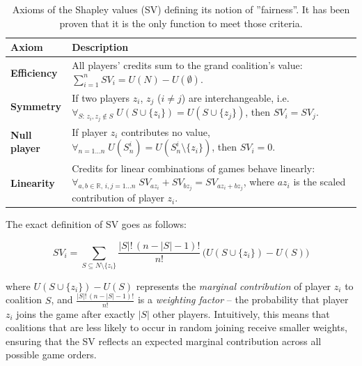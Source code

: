 \begin{table}[htbp]
\caption{Axioms of the Shapley values (SV) defining its notion of ''fairness''. It has been proven that it is the only function to meet those criteria.}
\centering
\renewcommand{\arraystretch}{1.1}
\setlength{\tabcolsep}{6pt}
\begin{tabular}{p{} p{}}

\toprule

\textbf{Axiom} & \textbf{Description} \\

\midrule

\textbf{Efficiency} &
All players’ credits sum to the grand coalition’s value:
$\sum_{i=1}^n SV_i = U(N) - U(\emptyset)$. \\[2pt]

\textbf{Symmetry} &
If two players $z_i$, $z_j$ ($i \neq j$) are interchangeable,
i.e.\ $\forall_{S:\, z_i, z_j \notin S}\; U(S \cup \{z_i\}) = U(S \cup \{z_j\})$,
then $SV_i = SV_j$. \\[2pt]

\textbf{Null player} &
If player $z_i$ contributes no value,
$\forall_{n = 1 \dots n}\; U(S_n^i) = U(S_n^i \setminus \{z_i\})$,
then $SV_i = 0$. \\[2pt]

\textbf{Linearity} &
Credits for linear combinations of games behave linearly:
$\forall_{a,b \in \mathbb{R},\, i,j = 1 \dots n}\;
SV_{a z_i} + SV_{b z_j} = SV_{a z_i + b z_j}$,
where $a z_i$ is the scaled contribution of player $z_i$. \\

\bottomrule

\end{tabular}
\label{tab:shapley_values__axioms}
\end{table}

The exact definition of SV goes as follows:

\[
SV_i = \sum_{S \subseteq N \setminus \{z_i\}}
\frac{|S|!\,(n - |S| - 1)!}{n!} \,
\big(U(S \cup \{z_i\}) - U(S)\big)
\]

\noindent where \( U(S \cup \{z_i\}) - U(S) \) represents the \textit{marginal contribution} of player \( z_i \) to coalition \( S \), and
\( \frac{|S|!\,(n - |S| - 1)!}{n!} \) is a \textit{weighting factor} -- the probability that player \( z_i \) joins the game after exactly \(|S|\) other players. Intuitively, this means that coalitions that are less likely to occur in random joining receive smaller weights, ensuring that the SV reflects an expected marginal contribution across all possible game orders.

